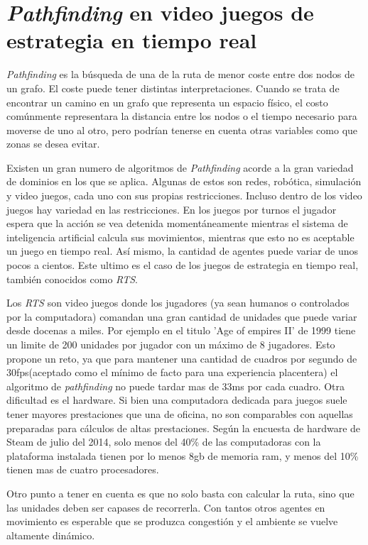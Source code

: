 
\section{\emph{Pathfinding} en video juegos de estrategia en tiempo real}

\emph{Pathfinding} es la búsqueda de una de la ruta de menor coste entre dos
nodos de un grafo. El coste puede tener distintas interpretaciones. Cuando se
trata de encontrar un camino en un grafo que representa un espacio físico, el
costo comúnmente representara la distancia entre los nodos o el tiempo necesario
para moverse de uno al otro, pero podrían tenerse en cuenta otras variables como
que zonas se desea evitar.

Existen un gran numero de algoritmos de \emph{Pathfinding} acorde a la gran
variedad de dominios en los que se aplica. Algunas de estos son redes,
robótica, simulación y video juegos, cada uno con sus propias restricciones.
Incluso dentro de los video juegos hay variedad en las restricciones. En los
juegos por turnos el jugador espera que la acción se vea detenida
momentáneamente mientras el sistema de inteligencia artificial calcula sus
movimientos, mientras que esto no es aceptable un juego en tiempo real. Así
mismo, la cantidad de agentes puede variar de unos pocos a cientos. Este ultimo
es el caso de los juegos de estrategia en tiempo real, también conocidos como
\emph{RTS}.

Los \emph{RTS} son video juegos donde los jugadores (ya sean humanos o
controlados por la computadora) comandan una gran cantidad de unidades que puede
variar desde docenas a miles. Por ejemplo en el titulo 'Age of empires II' de
1999 tiene un limite de 200 unidades por jugador con un máximo de 8 jugadores.
Esto propone un reto, ya que para mantener una cantidad de cuadros por segundo
de 30fps(aceptado como el mínimo de facto para una experiencia
placentera\cite{framerate06}) el algoritmo de \emph{pathfinding} no puede tardar
mas de 33ms por cada cuadro. Otra dificultad es el hardware. Si bien una
computadora dedicada para juegos suele tener mayores prestaciones que una de
oficina, no son comparables con aquellas preparadas para cálculos de altas
prestaciones. Según la encuesta de hardware de Steam\cite{steamSurvey} de julio
del 2014, solo menos del 40\% de las computadoras con la plataforma instalada
tienen por lo menos 8gb de memoria ram, y menos del 10\% tienen mas de cuatro
procesadores. 

Otro punto a tener en cuenta es que no solo basta con calcular la ruta, sino que
las unidades deben ser capases de recorrerla. Con tantos otros agentes en
movimiento es esperable que se produzca congestión y el ambiente se vuelve
altamente dinámico.


